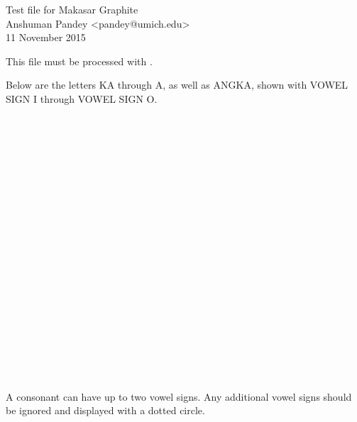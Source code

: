 \documentclass[12pt]{article}
\begin{document}
Test file for Makasar Graphite \\ 
Anshuman Pandey <pandey@umich.edu> \\
11 November 2015
\vspace{.25in}

This file must be processed with \XeLaTeX{}.
\bigskip

Below are the letters KA through A, as well as ANGKA, 
shown with VOWEL SIGN I through VOWEL SIGN O.
\bigskip

{\Large\mak

𑻠 𑻠𑻳 𑻠𑻴 𑻠𑻵 𑻠𑻶 \\ 

𑻡 𑻡𑻳 𑻡𑻴 𑻡𑻵 𑻡𑻶 \\ 

𑻢 𑻢𑻳 𑻢𑻴 𑻢𑻵 𑻢𑻶 \\ 

𑻣 𑻣𑻳 𑻣𑻴 𑻣𑻵 𑻣𑻶 \\ 

𑻤 𑻤𑻳 𑻤𑻴 𑻤𑻵 𑻤𑻶 \\ 

𑻥 𑻥𑻳 𑻥𑻴 𑻥𑻵 𑻥𑻶 \\ 

𑻦 𑻦𑻳 𑻦𑻴 𑻦𑻵 𑻦𑻶 \\ 

𑻧 𑻧𑻳 𑻧𑻴 𑻧𑻵 𑻧𑻶 \\ 

𑻨 𑻨𑻳 𑻨𑻴 𑻨𑻵 𑻨𑻶 \\ 

𑻩 𑻩𑻳 𑻩𑻴 𑻩𑻵 𑻩𑻶 \\ 

𑻪 𑻪𑻳 𑻪𑻴 𑻪𑻵 𑻪𑻶 \\ 

𑻫 𑻫𑻳 𑻫𑻴 𑻫𑻵 𑻫𑻶 \\ 

𑻬 𑻬𑻳 𑻬𑻴 𑻬𑻵 𑻬𑻶 \\ 

𑻭 𑻭𑻳 𑻭𑻴 𑻭𑻵 𑻭𑻶 \\ 

𑻮 𑻮𑻳 𑻮𑻴 𑻮𑻵 𑻮𑻶 \\ 

𑻯 𑻯𑻳 𑻯𑻴 𑻯𑻵 𑻯𑻶 \\ 

𑻰 𑻰𑻳 𑻰𑻴 𑻰𑻵 𑻰𑻶 \\ 

𑻱 𑻱𑻳 𑻱𑻴 𑻱𑻵 𑻱𑻶 \\ 

𑻲 𑻲𑻳 𑻲𑻴 𑻲𑻵 𑻲𑻶 \\ 

}

A consonant can have up to two vowel signs. Any 
additional vowel signs should be ignored and 
displayed with a dotted circle.
\bigskip

{\Large\mak 𑻠 𑻠𑻳 𑻠𑻴 𑻠𑻵 𑻠𑻶 𑻠𑻳𑻳 𑻠𑻴𑻴 𑻠𑻳𑻴 𑻠𑻵𑻵𑻵 𑻠𑻵𑻶𑻵} 
\end{document}
